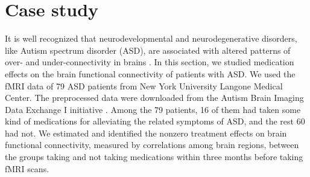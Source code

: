 \documentclass[12pt]{article}
\theoremstyle{definition}
\begin{document}


\setcounter{equation}{0}
\section{Case study}\label{se:case-study}

It is well recognized that neurodevelopmental and neurodegenerative disorders, like Autism spectrum disorder (ASD), are associated with altered patterns of over- and under-connectivity in brains \citep{kana2014brain}.
In this section, we studied medication effects on the brain functional connectivity of patients with ASD. 
We used the fMRI data of 79 ASD patients from New York University Langone Medical Center. 
The preprocessed data were downloaded from the Autism Brain Imaging Data Exchange I initiative \citep{craddock2013neuro}.
Among the 79 patients, 16 of them had taken some kind of medications for alleviating the related symptoms of ASD, and the rest 60 had not. 
We estimated and identified the nonzero treatment effects on brain functional connectivity, measured by correlations among brain regions, between the groups taking and not taking medications within three months before taking fMRI scans. 
\end{document}
